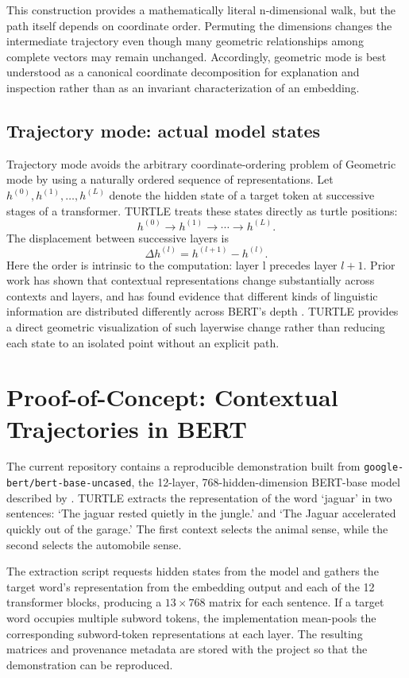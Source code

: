 \documentclass[manuscript,screen,nonacm]{acmart}
\begin{document}
This construction provides a mathematically literal n-dimensional walk, but the path itself depends on coordinate order. Permuting the dimensions changes the intermediate trajectory even though many geometric relationships among complete vectors may remain unchanged. Accordingly, geometric mode is best understood as a canonical coordinate decomposition for explanation and inspection rather than as an invariant characterization of an embedding.

\subsection{Trajectory mode: actual model states}\label{trajectory-mode-actual-model-states}

Trajectory mode avoids the arbitrary coordinate-ordering problem of Geometric mode by using a naturally ordered sequence of representations. Let \(h^{(0)},h^{(1)},\ldots,h^{(L)}\) denote the hidden state of a target token at successive stages of a transformer. TURTLE treats these states directly as turtle positions:
\[h^{(0)}\to h^{(1)}\to\cdots\to h^{(L)}.\]
The displacement between successive layers is
\[\Delta h^{(l)}=h^{(l+1)}-h^{(l)}.\]
Here the order is intrinsic to the computation: layer l precedes layer \(l+1\). Prior work has shown that contextual representations change substantially across contexts and layers, and has found evidence that different kinds of linguistic information are distributed differently across BERT's depth \citep{ethayarajh, tenney}. TURTLE provides a direct geometric visualization of such layerwise change rather than reducing each state to an isolated point without an explicit path.

\section{Proof-of-Concept: Contextual Trajectories in BERT}\label{proof-of-concept-contextual-trajectories-in-bert}

The current repository contains a reproducible demonstration built from \nolinkurl{google-bert/bert-base-uncased}, the 12-layer, 768-hidden-dimension BERT-base model described by \citep{devlin}. TURTLE extracts the representation of the word `jaguar' in two sentences: `The jaguar rested quietly in the jungle.' and `The Jaguar accelerated quickly out of the garage.' The first context selects the animal sense, while the second selects the automobile sense.

The extraction script requests hidden states from the model and gathers the target word's representation from the embedding output and each of the 12 transformer blocks, producing a \(13\times768\) matrix for each sentence. If a target word occupies multiple subword tokens, the implementation mean-pools the corresponding subword-token representations at each layer. The resulting matrices and provenance metadata are stored with the project so that the demonstration can be reproduced.
\end{document}

